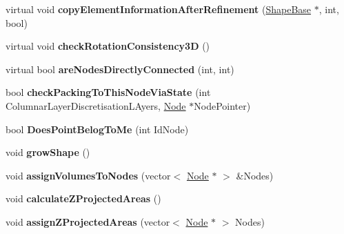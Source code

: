 \begin{DoxyCompactItemize}
\item 
\hypertarget{classShapeBase_ac3cdc2a33b35c048087b47ce3a9f109f}{}virtual void {\bfseries copy\+Element\+Information\+After\+Refinement} (\hyperlink{classShapeBase}{Shape\+Base} $\ast$, int, bool)\label{classShapeBase_ac3cdc2a33b35c048087b47ce3a9f109f}

\item 
\hypertarget{classShapeBase_a4e33b4fea2d126f59ca0bcf73e07a253}{}virtual void {\bfseries check\+Rotation\+Consistency3\+D} ()\label{classShapeBase_a4e33b4fea2d126f59ca0bcf73e07a253}

\item 
\hypertarget{classShapeBase_aae5ef32d56aa383108f2d6912469138f}{}virtual bool {\bfseries are\+Nodes\+Directly\+Connected} (int, int)\label{classShapeBase_aae5ef32d56aa383108f2d6912469138f}

\item 
\hypertarget{classShapeBase_a4d7bfb4ed03b7633e02e753a485fbf01}{}bool {\bfseries check\+Packing\+To\+This\+Node\+Via\+State} (int Columnar\+Layer\+Discretisation\+L\+Ayers, \hyperlink{classNode}{Node} $\ast$Node\+Pointer)\label{classShapeBase_a4d7bfb4ed03b7633e02e753a485fbf01}

\item 
\hypertarget{classShapeBase_aed4c893952a6afad718a2037e0635296}{}bool {\bfseries Does\+Point\+Belog\+To\+Me} (int Id\+Node)\label{classShapeBase_aed4c893952a6afad718a2037e0635296}

\item 
\hypertarget{classShapeBase_a92ec10be4c8ba3dd3e4b95ccd08bba7b}{}void {\bfseries grow\+Shape} ()\label{classShapeBase_a92ec10be4c8ba3dd3e4b95ccd08bba7b}

\item 
\hypertarget{classShapeBase_acee26103666067517d905b32edfbf302}{}void {\bfseries assign\+Volumes\+To\+Nodes} (vector$<$ \hyperlink{classNode}{Node} $\ast$ $>$ \&Nodes)\label{classShapeBase_acee26103666067517d905b32edfbf302}

\item 
\hypertarget{classShapeBase_a4bc9c0bb828f73c105321fd5a25be8cc}{}void {\bfseries calculate\+Z\+Projected\+Areas} ()\label{classShapeBase_a4bc9c0bb828f73c105321fd5a25be8cc}

\item 
\hypertarget{classShapeBase_aec0c4844fb49f5e54ab31826ecbf6e31}{}void {\bfseries assign\+Z\+Projected\+Areas} (vector$<$ \hyperlink{classNode}{Node} $\ast$ $>$ Nodes)\label{classShapeBase_aec0c4844fb49f5e54ab31826ecbf6e31}


\end{DoxyCompactItemize}

